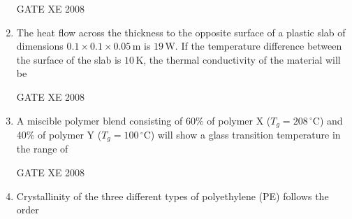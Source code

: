 \documentclass[12pt]{article}
\begin{document}
\begin{enumerate}
\begin{enumerate}
\end{enumerate}

GATE XE 2008

\item The heat flow across the thickness to the opposite surface of a plastic slab of dimensions $0.1 \times 0.1 \times 0.05 \, \text{m}$ is $19 \, \text{W}$. If the temperature difference between the surface of the slab is $10 \, \text{K}$, the thermal conductivity of the material will be

\begin{enumerate}
\end{enumerate}

GATE XE 2008

\item A miscible polymer blend consisting of 60\% of polymer X ($T_g = 208 \, ^\circ\text{C}$) and 40\% of polymer Y ($T_g = 100 \, ^\circ\text{C}$) will show a glass transition temperature in the range of

\begin{enumerate}
\end{enumerate}

GATE XE 2008

\item Crystallinity of the three different types of polyethylene (PE) follows the order


\end{enumerate}
\end{document}

